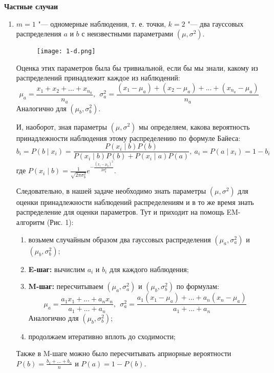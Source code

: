     \vspace{\baselineskip}
    \textbf{Частные случаи}
    \begin{enumerate}
    \item
    $m = 1$ "--- одномерные наблюдения, т. е. точки, $k = 2$ "--- два гауссовых распределения $a$ и $b$ с неизвестными параметрами $(\mu, \sigma^2)$.

    \begin{figure}[p]
    \begin{center}
    \texttt{[image: 1-d.png]}
    \caption{}
    \label{ris:experimcoded}
    \end{center}
    \end{figure}

    Оценка этих параметров была бы тривиальной, если бы мы знали, какому из распределений принадлежит каждое из наблюдений:
    $$\mu_a = \frac{x_1 + x_2 + ... + x_{n_a}}{n_a}, \ \ \sigma^2_a = \frac{(x_1 - \mu_a) + (x_2 - \mu_a) + ... + (x_{n_a} - \mu_a)}{n_a}$$
    Аналогично для $(\mu_b, \sigma^2_b)$.

    И, наоборот, зная параметры $(\mu, \sigma^2)$ мы определяем, какова вероятность принадлежности наблюдения этому распределению по формуле Байеса:
    $$ b_i = P(b \mid x_i) = \frac{P(x_i \mid b)P(b)}{P(x_i \mid b)P(b)+P(x_i \mid a)P(a)}, \ a_i = P(a \mid x_i) = 1 - b_i$$
    где $P(x_i \mid b) = \frac{1}{\sqrt{2\pi\sigma^2_b}}e^{-\frac{(x_i-\mu_b)^2}{2\sigma^2_b}}$.

    Следовательно, в нашей задаче необходимо знать параметры $(\mu, \sigma^2)$ для оценки принадлежности наблюдений распределениям и в то же время знать распределение для оценки параметров. Тут и приходит на помощь EM-алгоритм (Рис. 1):
        \begin{enumerate}
        \item
        возьмем случайным образом два гауссовых распределения $(\mu_a, \sigma^2_a)$ и $(\mu_b, \sigma^2_b)$;
        \item
        \textbf{E-шаг:} вычислим $a_i$ и $b_i$ для каждого наблюдения;
        \item
        \textbf{M-шаг:} пересчитываем $(\mu_a, \sigma^2_a)$ и $(\mu_b, \sigma^2_b)$ по формулам:
        $$\mu_a = \frac{a_1x_1 + ... + a_nx_n}{a_1 + ... + a_n}, \ \ \sigma^2_a = \frac{a_1(x_1 - \mu_a) + ... + a_n(x_n - \mu_a)}{a_1 + ... + a_n}$$
        Аналогично для $(\mu_b, \sigma^2_b)$;
        \item
        продолжаем итеративно вплоть до сходимости;
        \end{enumerate}
    Также в M-шаге можно было пересчитывать априорные вероятности $P(b) = \frac{b_1 + ... + b_n}{n}$ и $P(a) = 1 - P(b)$.


\end{enumerate}
